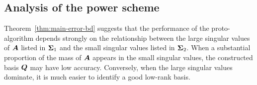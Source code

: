 \documentclass[final]{siamltex}
\newcounter{algorithm}[section]
\newtheorem{remark}{Remark}[section]
\begin{document}





\subsection{Analysis of the power scheme}

Theorem~\ref{thm:main-error-bd} suggests that the performance of
the proto-algorithm depends strongly on the relationship between the
large singular values of $\bm{A}$ listed in $\bm{\Sigma}_1$
and the small singular values listed in $\bm{\Sigma}_2$.
When a substantial proportion of the mass of $\bm{A}$ appears in the small
singular values, the constructed basis $\bm{Q}$ may have low accuracy.  Conversely,
when the large singular values dominate, it is much easier to identify a
good low-rank basis.
\end{document}

